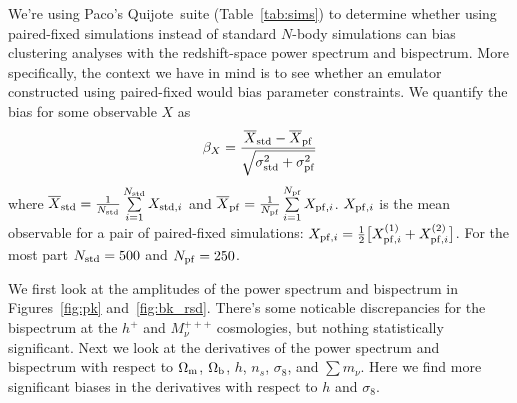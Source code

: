 \documentclass[12pt, letterpaper, preprint]{aastex62}
\newcommand{\Om}{\Omega_{\rm m}}
\newcommand{\Ob}{\Omega_{\rm b}}
\newcommand{\smnu}{\sum m_\nu}
\newcommand{\sig}{\sigma_8}
\newcommand{\quij}{{\sc Quijote}~}
\newcommand{\beq}{\begin{equation}}
\newcommand{\eeq}{\end{equation}}
\begin{document}
\sloppy\sloppypar\frenchspacing 
We're using Paco's \quij suite (Table~\ref{tab:sims}) to determine
whether using paired-fixed simulations instead of standard $N$-body 
simulations can bias clustering analyses with the redshift-space
power spectrum and bispectrum. More specifically, the context we have
in mind is to see whether an emulator constructed using paired-fixed
would bias parameter constraints. We quantify the bias for some observable 
$X$ as
\beq
\beta_X = \frac{\overline{X}_{\rm std} - \overline{X}_{\rm pf}}{\sqrt{\sigma_{\rm std}^2 + \sigma_{\rm pf}^2}}
\eeq
where $\overline{X}_{\rm std} = \frac{1}{N_{\rm std}}\sum\limits_{i=1}^{N_{\rm std}} X_{{\rm std}, i}$ 
and $\overline{X}_{\rm pf} = \frac{1}{N_{\rm pf}}\sum\limits_{i=1}^{N_{\rm pf}} X_{{\rm pf}, i}$. 
$X_{{\rm pf},i}$ is the mean observable for a pair of paired-fixed simulations: 
$X_{{\rm pf},i} = \frac{1}{2} \big[ X_{{\rm pf},i}^{(1)} + X_{{\rm pf},i}^{(2)}\big]$.
For the most part $N_{\rm std} = 500$ and $N_{\rm pf} = 250$. 

We first look at the amplitudes of the power spectrum and bispectrum in 
Figures~\ref{fig:pk} and~\ref{fig:bk_rsd}. There's some noticable discrepancies
for the bispectrum at the $h^+$ and $M_\nu^{+++}$ cosmologies, but nothing 
statistically significant. Next we look at the derivatives of the power 
spectrum and bispectrum with respect to $\Om$, $\Ob$, $h$, $n_s$, $\sig$, 
and $\smnu$. Here we find more significant biases in the derivatives 
with respect to $h$ and $\sig$.
\end{document}
